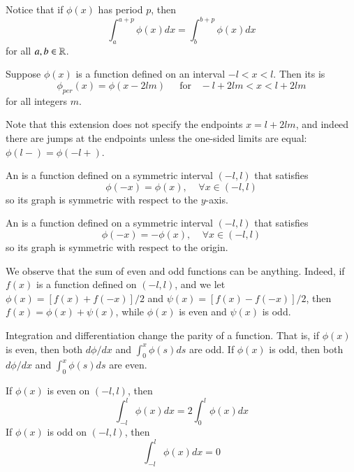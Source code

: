 \documentclass[12pt, a4paper, oneside, openright, titlepage]{book}
\begin{document}
Notice that if $\phi(x)$ has period $p$, then \begin{equation*}
    \int_a^{a+p}\phi(x)dx = \int_b^{b+p}\phi(x)dx
\end{equation*}
for all $a,b \in \mathbb R$.

\begin{defn}
    Suppose $\phi(x)$ is a function defined on an interval $-l < x < l$. Then its  is \begin{equation*}
        \phi_{per}(x) = \phi(x-2lm)\;\;\;\;\text{ for }\;\;-l + 2lm < x < l+2lm
    \end{equation*}
    for all integers $m$.
\end{defn}

Note that this extension does not specify the endpoints $x = l+2lm$, and indeed there are jumps at the endpoints unless the one-sided limits are equal: $\phi(l-) = \phi(-l+)$.

\begin{defn}
    An  is a function defined on a symmetric interval $(-l,l)$ that satisfies \begin{equation*}
        \phi(-x) = \phi(x),\;\;\;\;\forall x \in (-l,l)
    \end{equation*}
    so its graph is symmetric with respect to the $y$-axis.
\end{defn}



\begin{defn}
    An  is a function defined on a symmetric interval $(-l,l)$ that satisfies \begin{equation*}
        \phi(-x) = -\phi(x),\;\;\;\;\forall x \in (-l,l)
    \end{equation*}
    so its graph is symmetric with respect to the origin.
\end{defn}



We observe that the sum of even and odd functions can be anything. Indeed, if $f(x)$ is a function defined on $(-l,l)$, and we let $\phi(x) = [f(x)+f(-x)]/2$ and $\psi(x) = [f(x)-f(-x)]/2$, then $f(x) = \phi(x)+\psi(x)$, while $\phi(x)$ is even and $\psi(x)$ is odd.

Integration and differentiation change the parity of a function. That is, if $\phi(x)$ is even, then both $d\phi/dx$ and $\int_0^x\phi(s)ds$ are odd. If $\phi(x)$ is odd, then both $d\phi/dx$ and $\int_0^x\phi(s)ds$ are even.

\begin{rmk}
    If $\phi(x)$ is even on $(-l,l)$, then \begin{equation*}
        \int_{-l}^l\phi(x)dx = 2\int_0^l\phi(x)dx
    \end{equation*}
    If $\phi(x)$ is odd on $(-l,l)$, then \begin{equation*}
        \int_{-l}^l\phi(x)dx = 0
    \end{equation*}
\end{rmk}
\end{document}

